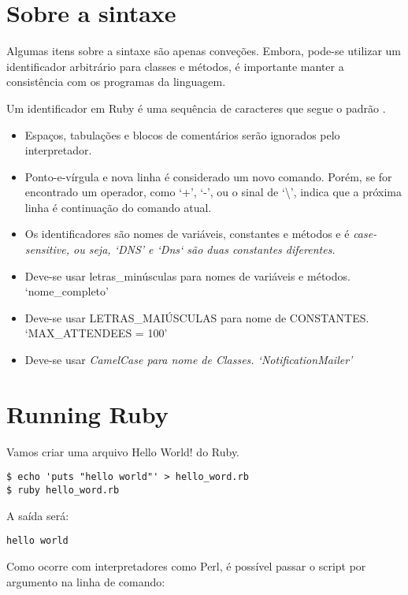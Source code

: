 \documentclass[serif,mathserif]{book}
\begin{document}
\section{Sobre a sintaxe}

Algumas itens sobre a sintaxe são apenas conveções. Embora, pode-se utilizar um identificador arbitrário para classes 
e métodos, é importante manter a consistência com os programas da linguagem.
 
Um identificador em Ruby é uma sequência de caracteres que segue o padrão \verbatim{[a-zA-Z_][a-zA-Z0-9_]*}.
 
\begin{itemize}
  \item  Espaços, tabulações e blocos de comentários serão ignorados pelo interpretador.
  \item  Ponto-e-vírgula e nova linha é considerado um novo comando. Porém, se for encontrado um operador, como `+', `-', ou o sinal de `\textbackslash', indica que a 
próxima linha é continuação do comando atual.
  \item  Os identificadores são nomes de variáveis, constantes e métodos e é \em{case-sensitive}, ou seja, `DNS' e `Dns` são duas constantes diferentes.
  \item  Deve-se usar letras\_minúsculas para nomes de variáveis e métodos. `nome\_completo'
  \item  Deve-se usar LETRAS\_MAIÚSCULAS para nome de CONSTANTES. `MAX\_ATTENDEES = 100'
  \item  Deve-se usar \em{CamelCase} para nome de Classes. `NotificationMailer'
\end{itemize}

\section {Running Ruby}

Vamos criar uma arquivo Hello World! do Ruby.

\begin{lstlisting}[style=BashInputStyle]
$ echo 'puts "hello world"' > hello_word.rb
$ ruby hello_word.rb
\end{lstlisting}

A saída será: 

\begin{lstlisting}[style=BashOutputStyle]
hello world
\end{lstlisting}

Como ocorre com interpretadores como Perl, é possível passar o script por argumento na linha de comando:
\end{document}
